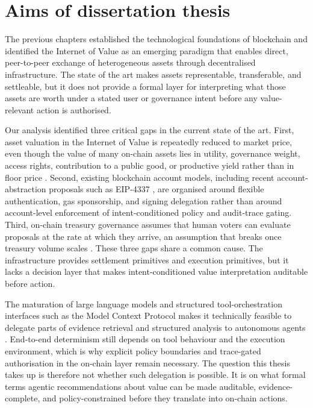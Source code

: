 \section{Aims of dissertation thesis}
\label{sec:aims}

The previous chapters established the technological foundations of blockchain and identified the Internet of Value as an emerging paradigm that enables direct, peer-to-peer exchange of heterogeneous assets through decentralised infrastructure. The state of the art makes assets representable, transferable, and settleable, but it does not provide a formal layer for interpreting what those assets are worth under a stated user or governance intent before any value-relevant action is authorised.

Our analysis identified three critical gaps in the current state of the art. First, asset valuation in the Internet of Value is repeatedly reduced to market price, even though the value of many on-chain assets lies in utility, governance weight, access rights, contribution to a public good, or productive yield rather than in floor price \cite{Lohmer2024, Ante2021}. Second, existing blockchain account models, including recent account-abstraction proposals such as EIP-4337 \cite{Buterin2021, Wang2023, Duan2024}, are organised around flexible authentication, gas sponsorship, and signing delegation rather than around account-level enforcement of intent-conditioned policy and audit-trace gating. Third, on-chain treasury governance assumes that human voters can evaluate proposals at the rate at which they arrive, an assumption that breaks once treasury volume scales \cite{Valastin2024proto}. These three gaps share a common cause. The infrastructure provides settlement primitives and execution primitives, but it lacks a decision layer that makes intent-conditioned value interpretation auditable before action.

The maturation of large language models and structured tool-orchestration interfaces such as the Model Context Protocol makes it technically feasible to delegate parts of evidence retrieval and structured analysis to autonomous agents \cite{Sumers2024, Wu2023}. End-to-end determinism still depends on tool behaviour and the execution environment, which is why explicit policy boundaries and trace-gated authorisation in the on-chain layer remain necessary. The question this thesis takes up is therefore not whether such delegation is possible. It is on what formal terms agentic recommendations about value can be made auditable, evidence-complete, and policy-constrained before they translate into on-chain actions.

